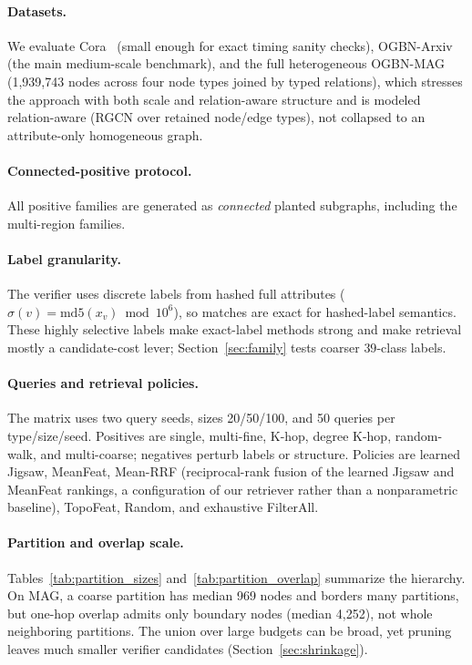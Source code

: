 \documentclass[runningheads]{llncs}
\begin{document}
\paragraph{Datasets.}
We evaluate Cora~\cite{ref_cora} (small enough for exact timing sanity checks), OGBN-Arxiv~\cite{ref_ogb} (the main medium-scale benchmark), and the full heterogeneous OGBN-MAG (1{,}939{,}743 nodes across four node types joined by typed relations), which stresses the approach with both scale and relation-aware structure and is modeled relation-aware (RGCN over retained node/edge types), not collapsed to an attribute-only homogeneous graph.

\paragraph{Connected-positive protocol.}
All positive families are generated as \emph{connected} planted subgraphs, including the multi-region families.

\paragraph{Label granularity.} The verifier uses discrete labels from hashed full attributes ($\sigma(v)=\mathrm{md5}(x_v)\bmod 10^{6}$), so matches are exact for hashed-label semantics. These highly selective labels make exact-label methods strong and make retrieval mostly a candidate-cost lever; Section~\ref{sec:family} tests coarser $39$-class labels.

\paragraph{Queries and retrieval policies.}
The matrix uses two query seeds, sizes 20/50/100, and 50 queries per type/size/seed. Positives are single, multi-fine, K-hop, degree K-hop, random-walk, and multi-coarse; negatives perturb labels or structure. Policies are learned Jigsaw, MeanFeat, Mean-RRF (reciprocal-rank fusion of the learned Jigsaw and MeanFeat rankings, a configuration of our retriever rather than a nonparametric baseline), TopoFeat, Random, and exhaustive FilterAll.

\paragraph{Partition and overlap scale.}
Tables~\ref{tab:partition_sizes} and~\ref{tab:partition_overlap} summarize the hierarchy. On MAG, a coarse partition has median 969 nodes and borders many partitions, but one-hop overlap admits only boundary nodes (median 4{,}252), not whole neighboring partitions. The union over large budgets can be broad, yet pruning leaves much smaller verifier candidates (Section~\ref{sec:shrinkage}).
\end{document}
